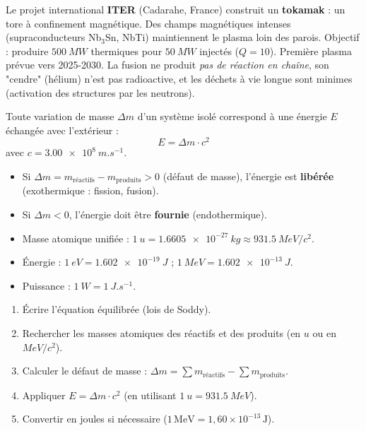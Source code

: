 \documentclass[11pt]{article}
\newcounter{popsec}
\newcounter{popsub}
\newcommand{\courssub}[1]{%
  \stepcounter{popsub}%
  \par\vspace{9pt}\noindent{\popxbold\fontsize{11.5}{13}\selectfont\color{popink}{\color{poporange}\thepopsec.\thepopsub}\hspace{6pt}#1}\par\nopagebreak\vspace{4pt}
}
\begin{document}
\begin{savaistu}
Le projet international \textbf{ITER} (Cadarahe, France) construit un \textbf{tokamak} : un tore à confinement magnétique. Des champs magnétiques intenses (supraconducteurs Nb$_3$Sn, NbTi) maintiennent le plasma loin des parois. Objectif : produire $\SI{500}{MW}$ thermiques pour $\SI{50}{MW}$ injectés ($Q=10$). Première plasma prévue vers 2025-2030. La fusion ne produit \emph{pas de réaction en chaîne}, son "cendre" (hélium) n'est pas radioactive, et les déchets à vie longue sont minimes (activation des structures par les neutrons).
\end{savaistu}

\courssub{Aspect énergétique : $E = \Delta m\,c^2$}

\begin{propriete}
Toute variation de masse $\Delta m$ d'un système isolé correspond à une énergie $E$ échangée avec l'extérieur :
\[ E = \Delta m \cdot c^2 \]
avec $c = \SI{3,00e8}{m.s^{-1}}$.
\begin{itemize}
\item Si $\Delta m = m_{\text{réactifs}} - m_{\text{produits}} > 0$ (défaut de masse), l'énergie est \textbf{libérée} (exothermique : fission, fusion).
\item Si $\Delta m < 0$, l'énergie doit être \textbf{fournie} (endothermique).
\end{itemize}
\end{propriete}

\begin{aretenir}
\begin{itemize}
\item Masse atomique unifiée : $\SI{1}{u} = \SI{1,6605e-27}{kg} \approx \SI{931,5}{MeV/c^2}$.
\item Énergie : $\SI{1}{eV} = \SI{1,602e-19}{J}$ ; $\SI{1}{MeV} = \SI{1,602e-13}{J}$.
\item Puissance : $\SI{1}{W} = \SI{1}{J.s^{-1}}$.
\end{itemize}
\end{aretenir}

\begin{methode}
\begin{enumerate}
\item Écrire l'équation équilibrée (lois de Soddy).
\item Rechercher les masses atomiques des réactifs et des produits (en $u$ ou en $\si{MeV/c^2}$).
\item Calculer le défaut de masse : $\Delta m = \sum m_{\text{réactifs}} - \sum m_{\text{produits}}$.
\item Appliquer $E = \Delta m \cdot c^2$ (en utilisant $\SI{1}{u} = \SI{931,5}{MeV}$).
\item Convertir en joules si nécessaire ($1\,\text{MeV} = 1,60\times 10^{-13}\,\text{J}$).
\end{enumerate}
\end{methode}
\end{document}
